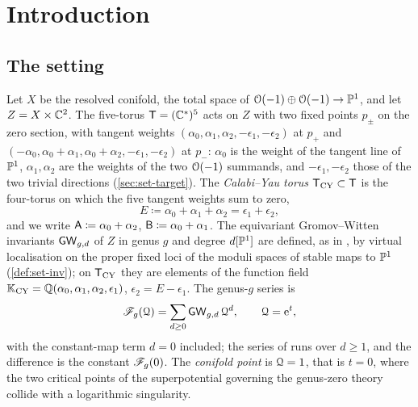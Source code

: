\section{Introduction}
\label{sec:int}


\subsection{The setting}
\label{sec:int-setting}

Let $X$ be the resolved conifold, the total space of $\mathcal{O}(-1)\oplus\mathcal{O}(-1)\to\mathbb{P}^1$, and let $Z=X\times\mathbb{C}^2$. The five-torus $\mathsf{T}=(\mathbb{C}^*)^5$ acts on $Z$ with two fixed points $p_\pm$ on the zero section, with tangent weights $(\alpha_0,\alpha_1,\alpha_2,-\epsilon_1,-\epsilon_2)$ at $p_+$ and $(-\alpha_0,\alpha_0+\alpha_1,\alpha_0+\alpha_2,-\epsilon_1,-\epsilon_2)$ at $p_-$: $\alpha_0$ is the weight of the tangent line of $\mathbb{P}^1$, $\alpha_1,\alpha_2$ are the weights of the two $\mathcal{O}(-1)$ summands, and $-\epsilon_1,-\epsilon_2$ those of the two trivial directions (\cref{sec:set-target}). The \emph{Calabi--Yau torus} $\mathsf{T}_{\mathrm{CY}}\subset\mathsf{T}$ is the four-torus on which the five tangent weights sum to zero,
\[
E\coloneqq\alpha_0+\alpha_1+\alpha_2=\epsilon_1+\epsilon_2 ,
\]
and we write $\mathsf{A}\coloneqq\alpha_0+\alpha_2$, $\mathsf{B}\coloneqq\alpha_0+\alpha_1$. The equivariant Gromov--Witten invariants $\mathsf{GW}_{g,d}$ of $Z$ in genus $g$ and degree $d[\mathbb{P}^1]$ are defined, as in \cite{BS}, by virtual localisation on the proper fixed loci of the moduli spaces of stable maps to $\mathbb{P}^1$ (\cref{def:set-inv}); on $\mathsf{T}_{\mathrm{CY}}$ they are elements of the function field $\mathbb{K}_{\mathrm{CY}}=\mathbb{Q}(\alpha_0,\alpha_1,\alpha_2,\epsilon_1)$, $\epsilon_2=E-\epsilon_1$. The genus-$g$ series is
\[
\mathscr{F}_g(\mathcal{Q})=\sum_{d\geq0}\mathsf{GW}_{g,d}\,\mathcal{Q}^d ,\qquad \mathcal{Q}=\mathrm{e}^{t},
\]
with the constant-map term $d=0$ included; the series of \cite{BS} runs over $d\geq1$, and the difference is the constant $\mathscr{F}_g(0)$. The \emph{conifold point} is $\mathcal{Q}=1$, that is $t=0$, where the two critical points of the superpotential governing the genus-zero theory collide with a logarithmic singularity.

